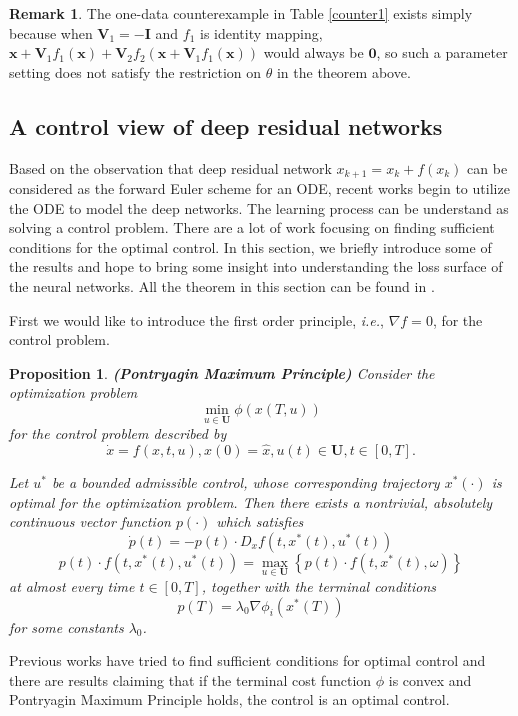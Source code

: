 \documentclass{article}
\theoremstyle{plain}
\newtheorem{prop}{Proposition}
\theoremstyle{definition}
\newtheorem{rem}{Remark}
\begin{document}
\begin{rem}
The one-data counterexample in Table \ref{counter1} exists simply because when $\mathbf{V}_1=-\mathbf{I}$ and $f_1$ is identity mapping, $\mathbf{x}+\mathbf{V}_1f_1(\mathbf{x})+\mathbf{V}_2f_2(\mathbf{x}+\mathbf{V}_1f_1(\mathbf{x}))$ would always be $\mathbf{0}$, so such a parameter setting does not satisfy the restriction on $\theta$ in the theorem above.
\end{rem}

\subsection{A control view of deep residual networks}

Based on the observation that deep residual network $x_{k+1}=x_{k}+f(x_k)$ can be considered as the forward Euler scheme for an ODE, recent works begin to utilize the ODE to model the deep networks. The learning process can be understand as solving a control problem. There are a lot of work focusing on finding sufficient conditions for the optimal control. In this section, we briefly introduce some of the results and hope to bring some insight into understanding the loss surface of the neural networks. All the theorem in this section can be found in \cite{bressan2007introduction}.

First we would like to introduce the first order principle, \emph{i.e.}, $\nabla f=0$, for the control problem.
\begin{prop}
    \textbf{(Pontryagin Maximum Principle)} Consider the optimization problem $$\min_{u\in\mathbf{U}} \phi(x(T,u))$$ for the control problem described by
    $$\dot x = f(x,t,u),x(0)=\hat{x},u(t)\in\mathbf{U},t\in [0,T].$$

    Let $u^*$ be a bounded admissible control, whose corresponding trajectory $x^*(\cdot)$ is optimal for the optimization problem. Then there exists a nontrivial, absolutely continuous vector function $p(\cdot)$ which satisfies
    $$\dot{p}(t)=-p(t)\cdot D_xf(t,x^*(t),u^*(t))$$
    $$p(t)\cdot f(t,x^*(t),u^*(t))=\max_{u\in\mathbf{U}}\left\{p(t)\cdot f(t,x^*(t),\omega)\right\}$$
    at almost every time $t\in[0,T]$, together with the terminal conditions
    $$p(T)=\lambda_0\nabla\phi_i(x^*(T))$$
    for some constants $\lambda_0$.
\end{prop}

Previous works have tried to find sufficient conditions for optimal control and there are results claiming that if the terminal cost function $\phi$ is convex and Pontryagin Maximum Principle holds, the control is an optimal control.
\end{document}
